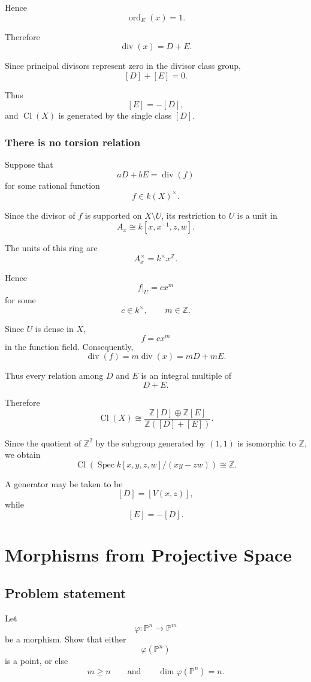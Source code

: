 \documentclass[12pt,a4paper]{article}
\DeclareMathOperator{\Spec}{Spec}
\newcommand{\divisor}{\operatorname{div}}
\newcommand{\Z}{\mathbb{Z}}
\newcommand{\Cl}{\operatorname{Cl}}
\providecommand{\Spec}{\operatorname{Spec}}
\providecommand{\Pj}{\mathbb P}
\theoremstyle{notespace}
\begin{document}
Hence
\[
\operatorname{ord}_E(x)=1.
\]

Therefore
\[
\divisor(x)=D+E.
\]

Since principal divisors represent zero in the divisor class group,
\[
[D]+[E]=0.
\]

Thus
\[
[E]=-[D],
\]
and \(\Cl(X)\) is generated by the single class \([D]\).

\subsubsection{There is no torsion relation}

Suppose that
\[
aD+bE=\divisor(f)
\]
for some rational function
\[
f\in k(X)^\times.
\]

Since the divisor of \(f\) is supported on \(X\setminus U\), its restriction to \(U\) is a unit in
\[
A_x\cong k[x,x^{-1},z,w].
\]

The units of this ring are
\[
A_x^\times=k^\times x^{\Z}.
\]

Hence
\[
f|_U=cx^m
\]
for some
\[
c\in k^\times,
\qquad
m\in \Z.
\]

Since \(U\) is dense in \(X\),
\[
f=cx^m
\]
in the function field. Consequently,
\[
\divisor(f)
=
m\divisor(x)
=
mD+mE.
\]

Thus every relation among \(D\) and \(E\) is an integral multiple of
\[
D+E.
\]

Therefore
\[
\Cl(X)
\cong
\frac{\Z[D]\oplus \Z[E]}
{\Z([D]+[E])}.
\]

Since the quotient of \(\Z^2\) by the subgroup generated by \((1,1)\) is isomorphic to \(\Z\), we obtain
\[
\boxed{
	\Cl\!\left(\Spec k[x,y,z,w]/(xy-zw)\right)
	\cong
	\Z.
}
\]

A generator may be taken to be
\[
[D]=[V(x,z)],
\]
while
\[
[E]=-[D].
\]

\section{Morphisms from Projective Space}

\subsection*{Problem statement}

Let
\[
\varphi:\Pj^n\longrightarrow \Pj^m
\]
be a morphism. Show that either
\[
\varphi(\Pj^n)
\]
is a point, or else
\[
m\geq n
\qquad\text{and}\qquad
\dim \varphi(\Pj^n)=n.
\]
\end{document}
